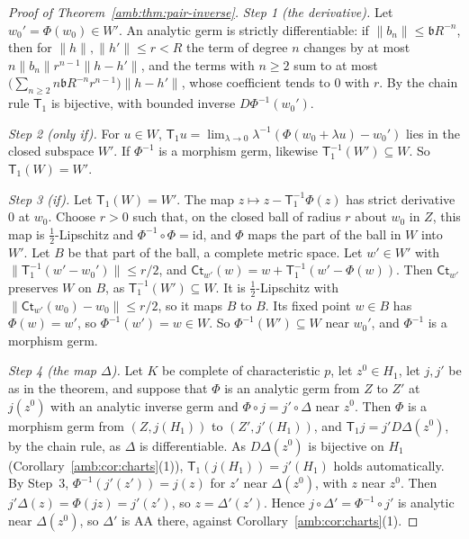 \documentclass[11pt]{amsart}
\theoremstyle{definition}
\theoremstyle{remark}
\numberwithin{equation}{section}
\newcommand{\id}{\mathrm{id}}
\newcommand{\norm}[1]{\lVert #1\rVert}
\theoremstyle{plain}
\theoremstyle{definition}
\theoremstyle{plain}
\begin{document}
\begin{proof}[Proof of Theorem~\ref{amb:thm:pair-inverse}]
\emph{Step 1 (the derivative).} Let $w_0'=\Phi(w_0)\in W'$. An analytic germ is strictly differentiable: if $\norm{b_n}\le \mathfrak bR^{-n}$, then for $\norm h,\norm{h'}\le r<R$ the term of degree $n$ changes by at most $n\norm{b_n}r^{n-1}\norm{h-h'}$, and the terms with $n\ge2$ sum to at most $\bigl(\sum_{n\ge2}n\mathfrak bR^{-n}r^{n-1}\bigr)\norm{h-h'}$, whose coefficient tends to $0$ with $r$. By the chain rule $\mathsf T_1$ is bijective, with bounded inverse $D\Phi^{-1}(w_0')$.

\emph{Step 2 (only if).} For $u\in W$, $\mathsf T_1u=\lim_{\lambda\to0}\lambda^{-1}(\Phi(w_0+\lambda u)-w_0')$ lies in the closed subspace $W'$. If $\Phi^{-1}$ is a morphism germ, likewise $\mathsf T_1^{-1}(W')\subseteq W$. So $\mathsf T_1(W)=W'$.

\emph{Step 3 (if).} Let $\mathsf T_1(W)=W'$. The map $z\mapsto z-\mathsf T_1^{-1}\Phi(z)$ has strict derivative $0$ at $w_0$. Choose $r>0$ such that, on the closed ball of radius $r$ about $w_0$ in $Z$, this map is $\frac12$-Lipschitz and $\Phi^{-1}\circ\Phi=\id$, and $\Phi$ maps the part of the ball in $W$ into $W'$. Let $B$ be that part of the ball, a complete metric space. Let $w'\in W'$ with $\norm{\mathsf T_1^{-1}(w'-w_0')}\le r/2$, and $\mathsf{Ct}_{w'}(w)=w+\mathsf T_1^{-1}(w'-\Phi(w))$. Then $\mathsf{Ct}_{w'}$ preserves $W$ on $B$, as $\mathsf T_1^{-1}(W')\subseteq W$. It is $\frac12$-Lipschitz with $\norm{\mathsf{Ct}_{w'}(w_0)-w_0}\le r/2$, so it maps $B$ to $B$. Its fixed point $w\in B$ has $\Phi(w)=w'$, so $\Phi^{-1}(w')=w\in W$. So $\Phi^{-1}(W')\subseteq W$ near $w_0'$, and $\Phi^{-1}$ is a morphism germ.

\emph{Step 4 (the map $\Delta$).} Let $K$ be complete of characteristic $p$, let $z^0\in H_1$, let $j,j'$ be as in the theorem, and suppose that $\Phi$ is an analytic germ from $Z$ to $Z'$ at $j(z^0)$ with an analytic inverse germ and $\Phi\circ j=j'\circ\Delta$ near $z^0$. Then $\Phi$ is a morphism germ from $(Z,j(H_1))$ to $(Z',j'(H_1))$, and $\mathsf T_1j=j'D\Delta(z^0)$, by the chain rule, as $\Delta$ is differentiable. As $D\Delta(z^0)$ is bijective on $H_1$ (Corollary~\ref{amb:cor:charts}(1)), $\mathsf T_1(j(H_1))=j'(H_1)$ holds automatically. By Step~3, $\Phi^{-1}(j'(z'))=j(z)$ for $z'$ near $\Delta(z^0)$, with $z$ near $z^0$. Then $j'\Delta(z)=\Phi(jz)=j'(z')$, so $z=\Delta'(z')$. Hence $j\circ\Delta'=\Phi^{-1}\circ j'$ is analytic near $\Delta(z^0)$, so $\Delta'$ is AA there, against Corollary~\ref{amb:cor:charts}(1).
\end{proof}
\end{document}
